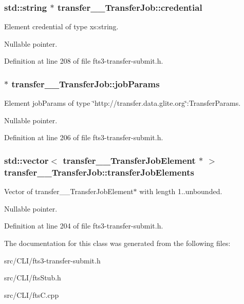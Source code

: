 \subsubsection[{credential}]{\setlength{\rightskip}{0pt plus 5cm}std::string $\ast$ {\bf transfer\_\-\_\-TransferJob::credential}}\label{classtransfer____TransferJob_a75ed6de04bbb682618911ba8c21d3010}


Element credential of type xs:string. 

Nullable pointer. 

Definition at line 208 of file fts3-\/transfer-\/submit.h.

\subsubsection[{jobParams}]{ $\ast$ {\bf transfer\_\-\_\-TransferJob::jobParams}}\label{classtransfer____TransferJob_acb79bfcb008745f36e641c5e5a9a5abb}


Element jobParams of type \char`\"{}http://transfer.data.glite.org\char`\"{}:TransferParams. 

Nullable pointer. 

Definition at line 206 of file fts3-\/transfer-\/submit.h.

\subsubsection[{transferJobElements}]{\setlength{\rightskip}{0pt plus 5cm}std::vector$<$ {\bf transfer\_\-\_\-TransferJobElement} $\ast$ $>$ {\bf transfer\_\-\_\-TransferJob::transferJobElements}}\label{classtransfer____TransferJob_acff3d8c546e3134bcd42cdf81a1e5357}


Vector of transfer\_\-\_\-TransferJobElement$\ast$ with length 1..unbounded. 

Nullable pointer. 

Definition at line 204 of file fts3-\/transfer-\/submit.h.



The documentation for this class was generated from the following files:\begin{DoxyCompactItemize}
\item 
src/CLI/fts3-\/transfer-\/submit.h\item 
src/CLI/ftsStub.h\item 
src/CLI/ftsC.cpp\end{DoxyCompactItemize}
